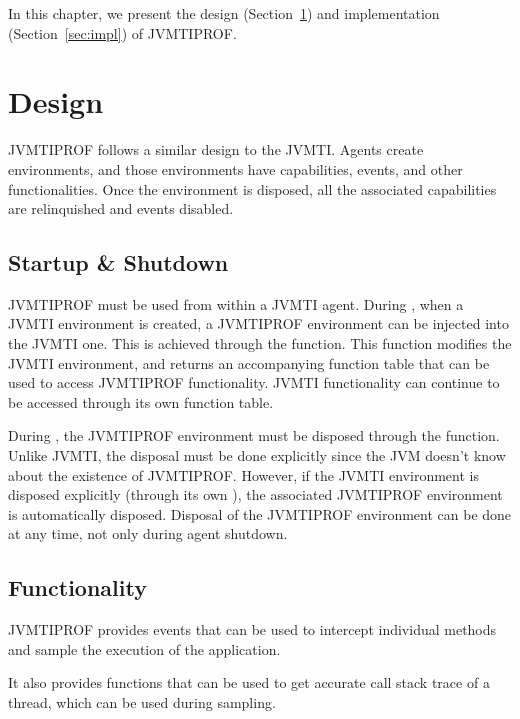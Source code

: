 

In this chapter, we present the design (Section~\ref{sec:design}) and implementation (Section~\ref{sec:impl}) of JVMTIPROF.

\section{Design} \label{sec:design}

JVMTIPROF follows a similar design to the JVMTI. Agents create environments, and those environments have capabilities, events, and other functionalities. Once the environment is disposed, all the associated capabilities are relinquished and events disabled.

\subsection{Startup \& Shutdown}

JVMTIPROF must be used from within a JVMTI agent. During , when a JVMTI environment is created, a JVMTIPROF environment can be injected into the JVMTI one. This is achieved through the  function. This function modifies the JVMTI environment, and returns an accompanying function table that can be used to access JVMTIPROF functionality. JVMTI functionality can continue to be accessed through its own function table.

During , the JVMTIPROF environment must be disposed through the  function. Unlike JVMTI, the disposal must be done explicitly since the JVM doesn't know about the existence of JVMTIPROF. However, if the JVMTI environment is disposed explicitly (through its own ), the associated JVMTIPROF environment is automatically disposed. Disposal of the JVMTIPROF environment can be done at any time, not only during agent shutdown.

\subsection{Functionality}

JVMTIPROF provides events that can be used to intercept individual methods and sample the execution of the application.

It also provides functions that can be used to get accurate call stack trace of a thread, which can be used during sampling.

